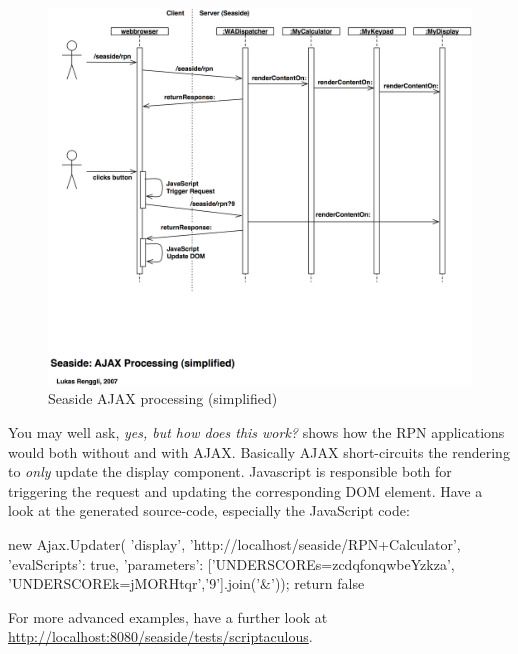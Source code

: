 \documentclass[a4paper,10pt,twoside]{book}
\begin{document}
\begin{figure}[ht]
\begin{center}
\includegraphics[width=\textwidth]{ajax-processing}
\caption{Seaside AJAX processing (simplified)}
\end{center}
\end{figure}


You may well ask, \emph{yes, but how does this work?}
 shows how the RPN applications would both without and with AJAX.
Basically AJAX short-circuits the rendering to \emph{only} update the display component.
Javascript is responsible both for triggering the request and updating the corresponding DOM element.
Have a look at the generated source-code, especially the JavaScript code:

\begin{code}{}
new Ajax.Updater(
	'display',
	'http://localhost/seaside/RPN+Calculator',
	{'evalScripts': true,
	  'parameters': ['UNDERSCOREs=zcdqfonqwbeYzkza', 'UNDERSCOREk=jMORHtqr','9'].join('&')});
return false
\end{code}

For more advanced examples, have a further look at \url{http://localhost:8080/seaside/tests/scriptaculous}.
\end{document}

